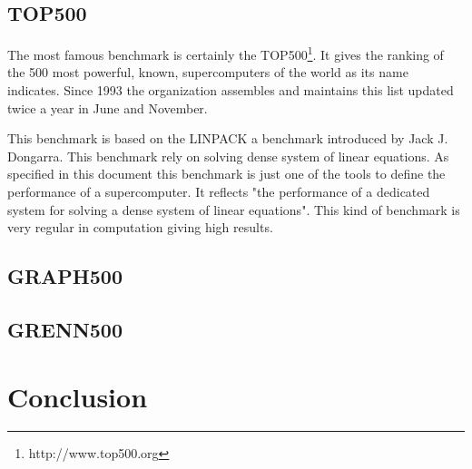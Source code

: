 \subsection{TOP500}
The most famous benchmark is certainly the TOP500\footnote{http://www.top500.org}. 
It gives the ranking of the 500 most powerful, known, supercomputers of the world as its name indicates.
Since 1993 the organization assembles and maintains this list updated twice a year in June and November.

This benchmark is based on the LINPACK\cite{dongarra1994top500} a benchmark introduced by Jack J. Dongarra.
This benchmark rely on solving  dense system of linear equations. 
As specified in this document this benchmark is just one of the tools to define the performance of a supercomputer. 
It reflects "the performance of a dedicated system for solving a dense system of linear equations".
This kind of benchmark is very regular in computation giving high results. 

\subsection{GRAPH500}



\subsection{GRENN500}

\section{Conclusion}


